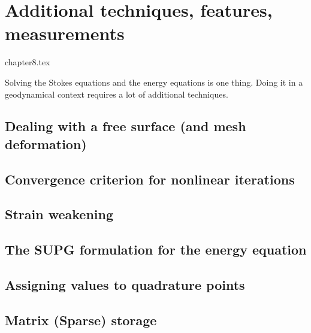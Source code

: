 \chapter{Additional techniques, features, measurements} %

\begin{flushright} {\tiny {\color{gray} chapter8.tex}} \end{flushright}

Solving the Stokes equations and the energy equations is one thing. Doing it in 
a geodynamical context requires a lot of additional techniques. 
\newpage %
\section{Dealing with a free surface (and mesh deformation)}\label{sec:freesurface}  
\newpage %
\section{Convergence criterion for nonlinear iterations\label{sec:nlconvcrit}} 
\newpage %
\section{Strain weakening} \label{sec:strainweakening}  %
\newpage %
\section{The SUPG formulation for the energy equation} \label{ss:supg}  %
\newpage %
\section{Assigning values to quadrature points \label{ss:averagings}}  %
\newpage %
\section{Matrix (Sparse) storage}  %
\newpage %
